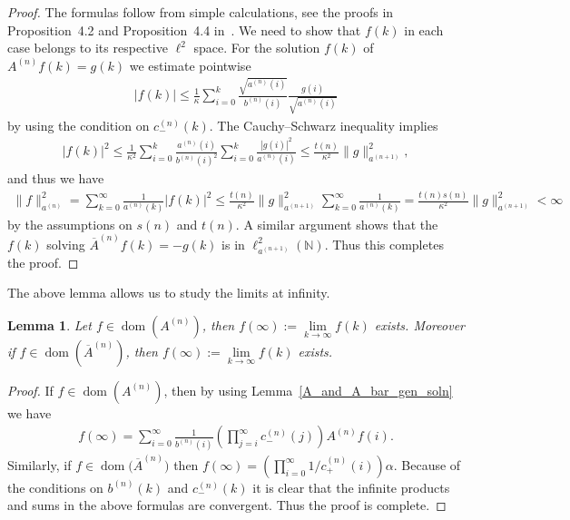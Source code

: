 \documentclass[11pt]{article}
\numberwithin{equation}{section}
\newtheorem{lem}[theo]{Lemma}
\DeclareMathOperator{\dom}{dom}
\begin{document}
\begin{proof}
The formulas follow from simple calculations, see the proofs in Proposition~4.2 and Proposition~4.4 in~\cite{KM1}.
We need to show that $f(k)$ in each case belongs to its respective $\ell^2$ space.
For the solution $f(k)$ of $A^{(n)}f(k) = g(k)$ we estimate pointwise
\begin{gather*}
|f(k)| \le \frac{1}{\kappa}\sum\limits_{i=0}^k\frac{\sqrt{a^{(n)}(i)}}{b^{(n)}(i)}\frac{g(i)}{\sqrt{a^{(n)}(i)}}
\end{gather*}
by using the condition on $c_-^{(n)}(k)$.
The Cauchy--Schwarz inequality implies
\begin{gather*}
|f(k)|^2 \le \frac{1}{\kappa^2}\sum\limits_{i=0}^k \frac{a^{(n)}(i)}{b^{(n)}(i)^2}\sum\limits_{i=0}^k
\frac{|g(i)|^2}{a^{(n)}(i)}\le \frac{t(n)}{\kappa^2}\|g\|_{a^{(n+1)}}^2,
\end{gather*}
and thus we have
\begin{gather*}
\|f\|_{a^{(n)}}^2 = \sum\limits_{k=0}^\infty \frac{1}{a^{(n)}(k)}|f(k)|^2 \le
\frac{t(n)}{\kappa^2}\|g\|_{a^{(n+1)}}^2\sum\limits_{k=0}^\infty \frac{1}{a^{(n)}(k)}=
\frac{t(n)s(n)}{\kappa^2}\|g\|_{a^{(n+1)}}^2 < \infty
\end{gather*}
by the assumptions on $s(n)$ and $t(n)$.
A similar argument shows that the $f(k)$ solving $\overline{A}^{(n)}f(k) = -g(k)$ is in $\ell_{a^{(n+1)}}^2({\mathbb
N})$.
Thus this completes the proof.
\end{proof}

The above lemma allows us to study the limits at inf\/inity.

\begin{lem}%
Let $f\in \dom(A^{(n)})$, then $f(\infty):= \lim\limits_{k\to\infty} f(k)$ exists.
Moreover if $f\in \dom(\overline{A}^{(n)})$, then $f(\infty):= \lim\limits_{k\to\infty} f(k)$ exists.
\end{lem}

\begin{proof}
If $f\in \dom(A^{(n)})$, then by using Lemma~\ref{A_and_A_bar_gen_soln} we have
\begin{gather*}
f(\infty) = \sum\limits_{i=0}^\infty
\frac{1}{b^{(n)}(i)}\left(\prod\limits_{j=i}^{\infty}c_-^{(n)}(j)\right)A^{(n)}f(i).
\end{gather*}
Similarly, if $f\in\dom\big(\overline{A}^{(n)}\big)$ then $f(\infty) = \left(\prod\limits_{i=0}^\infty 1/c_+^{(n)}(i)
\right)\alpha$.
Because of the conditions on $b^{(n)}(k)$ and $c_-^{(n)}(k)$ it is clear that the inf\/inite products and sums in the
above formulas are convergent.
Thus the proof is complete.
\end{proof}
\end{document}
